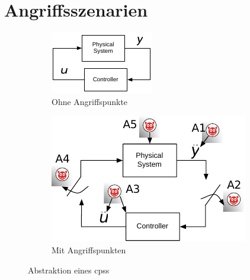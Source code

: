 \documentclass[final,bibliography=totocnumbered]{include/sikseminar}
\newcommand{\cps}{\glspl{cps}\xspace}
\begin{document}
\section{Angriffsszenarien}\label{sec:angriffszenarien}
\begin{figure}
    \centering
    \begin{subfigure}[b]{0.3\textwidth}
        \includegraphics[width=\textwidth]{abstrakt}
        \caption{Ohne Angriffspunkte}
        \label{fig:abstrakt}
    \end{subfigure}
    \qquad
    \begin{subfigure}[b]{0.4\textwidth}
        \includegraphics[width=\textwidth]{attack_points}
        \caption{Mit Angriffspunkten}
        \label{fig:attack_points}
    \end{subfigure}
    \caption{Abstraktion eines \cps~\cite{CAS08}}
\end{figure}
\end{document}
